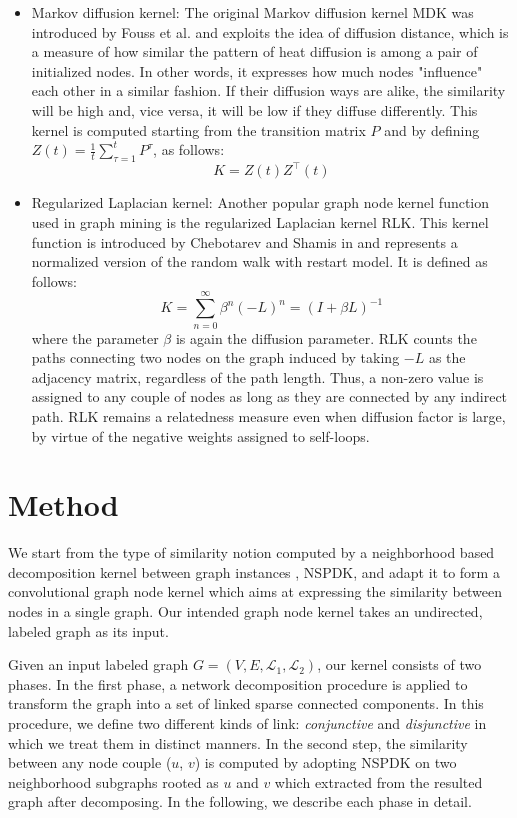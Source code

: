 \documentclass[review]{elsarticle}
\begin{document}
\begin{itemize}
\item Markov diffusion kernel: The original Markov diffusion kernel MDK was introduced by Fouss et al. \cite{fouss2006experimental} and exploits the idea of diffusion distance, which is a measure of how similar the pattern of heat diffusion is among a pair of initialized nodes. In other words, it expresses how much nodes "influence" each other in a similar fashion. If their diffusion ways are alike, the similarity will be high and, vice versa, it will be low if they diffuse differently. This kernel is computed starting from the transition matrix $P$ and by defining $Z(t) = \frac{1}{t}\sum_{\tau=1}^{t}P^{\tau}$, as follows:
\begin{equation} 
\label{MDK-formula}
K = Z(t)Z^{\top}(t)
\end{equation}

\item Regularized Laplacian kernel: Another popular graph node kernel function used in graph mining is the regularized Laplacian kernel RLK. This kernel function is introduced by Chebotarev and Shamis in \cite{chebotarev2006matrix} and represents a normalized version of the random walk with restart model. It is defined as follows:
\begin{equation} 
\label{RLK-formula}
K = \sum_{n=0}^{\infty}\beta^{n}(-L)^n = (I + \beta L)^{-1}
\end{equation}
where the parameter $\beta$ is again the diffusion parameter. RLK counts the paths connecting two nodes on the graph induced by taking $-L$ as the adjacency matrix, regardless of the path length. Thus, a non-zero value is assigned to any couple of nodes as long as they are connected by any indirect path. RLK remains a relatedness measure even when diffusion factor is large, by virtue of the negative weights assigned to self-loops.

\end{itemize}
\section{Method}
\label{method}
We start from the type of similarity notion computed by a neighborhood based decomposition kernel between graph instances \cite{costa2010fast}, NSPDK, and adapt it to form a convolutional graph node kernel which aims at expressing the similarity between nodes in a single graph. Our intended graph node kernel takes an undirected, labeled graph as its input.

Given an input labeled graph $G=(V,E, \mathcal{L}_1, \mathcal{L}_2)$, our kernel consists of two phases. In the first phase, a network decomposition procedure is applied to transform the graph into a set of linked sparse connected components. In this procedure, we define two different kinds of link: \textit{conjunctive} and \textit{disjunctive} in which we treat them in distinct manners. In the second step, the similarity between any node couple ($u$, $v$) is computed by adopting NSPDK on two neighborhood subgraphs rooted as $u$ and $v$ which extracted from the resulted graph after decomposing. In the following, we describe each phase in detail.
\end{document}
